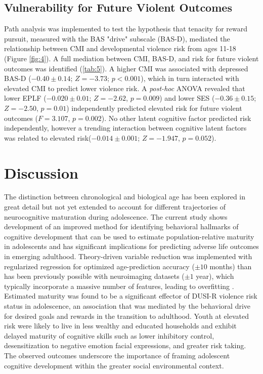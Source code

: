 \documentclass{article}%
\begin{document}
\subsection*{Vulnerability for Future Violent Outcomes} Path analysis was implemented to test the hypothesis that tenacity for reward pursuit, measured with the BAS "drive" subscale (BAS-D), mediated the relationship between CMI and developmental violence risk from ages 11-18 (Figure \ref{fig:4}). A full mediation between CMI, BAS-D, and risk for future violent outcomes was identified (\ref{tab:5}). A higher CMI was associated with depressed BAS-D ($-0.40\pm0.14$; $Z=-3.73$; $p<0.001$), which in turn interacted with elevated CMI to predict lower violence risk. A \textit{post-hoc} ANOVA revealed that lower EPLF ($-0.020\pm0.01$; $Z=-2.62$, $p=0.009$) and lower SES ($-0.36\pm0.15$; $Z=-2.50$, $p=0.01$) independently predicted elevated risk for future violent outcomes ($F=3.107$, $p=0.002$). No other latent cognitive factor predicted risk independently, however a trending interaction between cognitive latent factors was related to elevated risk($-0.014\pm0.001$; $Z=-1.947$,  $p=0.052$).
\\
\section*{Discussion} The distinction between chronological and biological age has been explored in great detail but not yet extended to account for different trajectories of neurocognitive maturation during adolescence. The current study shows development of an improved method for identifying behavioral hallmarks of cognitive development that can be used to estimate population-relative maturity in adolescents and has significant implications for predicting adverse life outcomes in emerging adulthood. Theory-driven variable reduction was implemented with regularized regression for optimized age-prediction accuracy ($\pm 10$ months) than has been previously possible with neuroimaging datasets ($\pm1$ year), which typically incorporate a massive number of features, leading to overfitting \citep{cole2017predicting, franke2012brain}. Estimated maturity was found to be a significant effector of DUSI-R violence risk status in adolescence, an association that was mediated by the behavioral drive for desired goals and rewards in the transition to adulthood. Youth at elevated risk were likely to live in less wealthy and educated households and exhibit delayed maturity of cognitive skills such as lower inhibitory control, desensitization to negative emotion facial expressions, and greater risk taking. The observed outcomes underscore the importance of framing adolescent cognitive development within the greater social environmental context.
\vspace{4pt}
\end{document}
